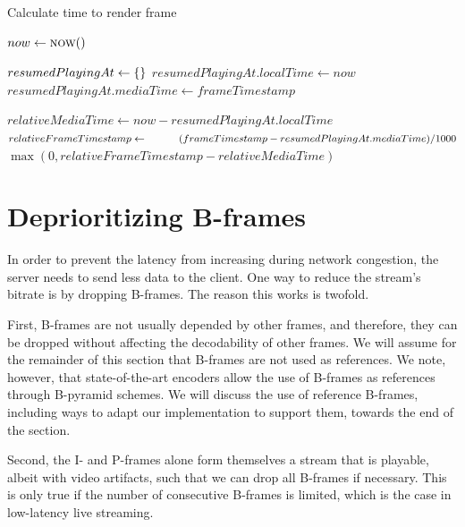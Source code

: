 \begin{algorithm}
\caption{Calculate time to render frame}\label{alg:time_until_frame}
\begin{algorithmic}
    \State $now \gets \Call{now}{\null}$
    \item[]
        \State $resumedPlayingAt \gets \textnormal{\{\}}$
        \State $resumedPlayingAt.localTime \gets now$
        \State $resumedPlayingAt.mediaTime \gets frameTimestamp$
    \EndIf
    \item[]
    \State $relativeMediaTime \gets now - resumedPlayingAt.localTime$
    \State $relativeFrameTimestamp \gets \newline
 \hspace*{3em}(frameTimestamp - resumedPlayingAt.mediaTime) / 1000$
    \State \Return $\max(0, relativeFrameTimestamp - relativeMediaTime)$
\EndFunction
\end{algorithmic}
\end{algorithm}


\section{Deprioritizing B-frames}\label{chapter:deprioritizing_b_frames}
In order to prevent the latency from increasing during network congestion, the server needs to send less data to the client. One way to reduce the stream's bitrate is by dropping B-frames. The reason this works is twofold. 

First, B-frames are not usually depended by other frames, and therefore, they can be dropped without affecting the decodability of other frames. We will assume for the remainder of this section that B-frames are not used as references. We note, however, that state-of-the-art encoders allow the use of B-frames as references through B-pyramid schemes. We will discuss the use of reference B-frames, including ways to adapt our implementation to support them, towards the end of the section. %

Second, the I- and P-frames alone form themselves a stream that is playable, albeit with video artifacts, such that we can drop all B-frames if necessary. This is only true if the number of consecutive B-frames is limited, which is the case in low-latency live streaming. %

